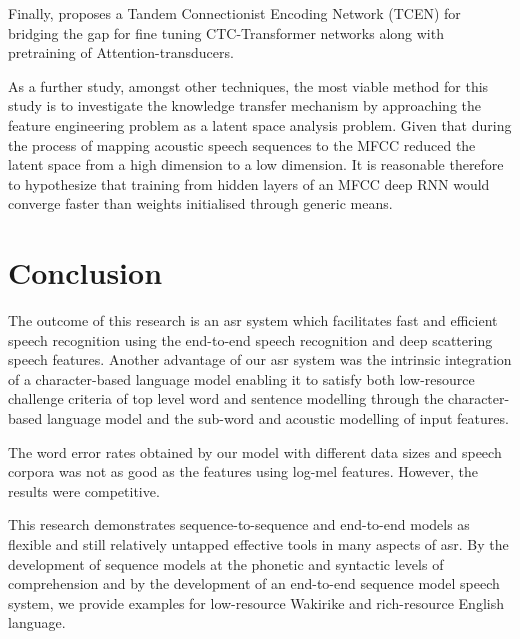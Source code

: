 Finally, \cite{wang2019bridging} proposes a Tandem Connectionist Encoding Network (TCEN) for bridging the gap for fine tuning CTC-Transformer networks along with pretraining of Attention-transducers.

As a further study, amongst other techniques, the most viable method for this study is to investigate the knowledge transfer mechanism by approaching the feature engineering problem as a latent space analysis problem.  Given that during the process of mapping acoustic speech sequences to the MFCC reduced the latent space from a high dimension to a low dimension.  It is reasonable therefore to hypothesize that training from hidden layers of an MFCC deep RNN would converge faster than weights initialised through generic means.

\startblue
\section{Conclusion}

The outcome of this research is an \acrshort{asr} system which facilitates fast and efficient speech recognition using the end-to-end speech recognition and deep scattering speech features.  Another advantage of our \acrshort{asr} system was the intrinsic integration of a character-based language model enabling it to satisfy both low-resource challenge criteria of top level word and sentence modelling through the character-based language model and the sub-word and acoustic modelling of input features.

The word error rates obtained by our model with different data sizes and speech corpora was not as good as the features using log-mel features. However, the results were competitive.

This research demonstrates sequence-to-sequence and end-to-end models as flexible and still relatively untapped effective tools in many aspects of \acrshort{asr}.  By the development of sequence models at the phonetic and syntactic levels of comprehension and by the development of an end-to-end sequence model speech system, we provide examples for low-resource Wakirike and rich-resource English language.
 
\stopblue



